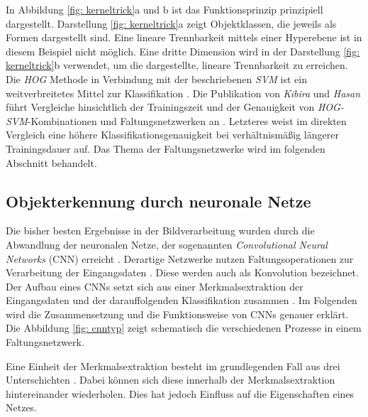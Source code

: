 		In Abbildung \ref{fig: kerneltrick}a und b ist das Funktionsprinzip prinzipiell dargestellt. Darstellung \ref{fig: kerneltrick}a zeigt Objektklassen, die jeweils als Formen dargestellt sind. Eine lineare Trennbarkeit mittels einer Hyperebene ist in diesem Beispiel nicht möglich. Eine dritte Dimension wird in der Darstellung \ref{fig: kerneltrick}b verwendet, um die dargestellte, lineare Trennbarkeit zu erreichen.\\
		
		
			
		Die \textit{HOG} Methode in Verbindung mit der beschriebenen \textit{SVM} ist ein weitverbreitetes Mittel zur Klassifikation \cite{hogsvmvscnn}. Die Publikation von \textit{Kibira} und \textit{Hasan} führt Vergleiche hinsichtlich der Trainingszeit und der Genauigkeit von \textit{HOG-SVM}-Kombinationen und Faltungsnetzwerken an \cite{hogsvmvscnn}. Letzteres weist im direkten Vergleich eine höhere Klassifikationsgenauigkeit bei verhältnismäßig längerer Trainingsdauer auf. Das Thema der Faltungsnetzwerke wird im folgenden Abschnitt behandelt. 
	
		\subsection{Objekterkennung durch neuronale Netze}
		\label{subsec: Objekterkennung durch neuronale Netze}
		Die bisher besten Ergebnisse in der Bildverarbeitung wurden durch die Abwandlung der neuronalen Netze, der sogenannten \textit{Convolutional Neural Networks} (CNN) erreicht \cite{deeplearning}. Derartige Netzwerke nutzen Faltungsoperationen zur Verarbeitung der Eingangsdaten   \cite{deeplearning}. Diese werden auch als Konvolution bezeichnet.\\ 
		
		Der Aufbau eines CNNs setzt sich aus einer Merkmalsextraktion der Eingangsdaten und der darauffolgenden Klassifikation zusammen \cite{deeplearning}. Im Folgenden wird die Zusammensetzung und die Funktionsweise von CNNs genauer erklärt. Die Abbildung \ref{fig: cnntyp} zeigt schematisch die verschiedenen Prozesse in einem Faltungsnetzwerk.\\ 
		
		
		
	 	\newpage
	
		Eine Einheit der Merkmalsextraktion besteht im grundlegenden Fall aus drei Unterschichten \cite{deeplearning}. Dabei können sich diese innerhalb der Merkmalsextraktion hintereinander wiederholen. Dies hat jedoch Einfluss auf die Eigenschaften eines Netzes.\\
		
